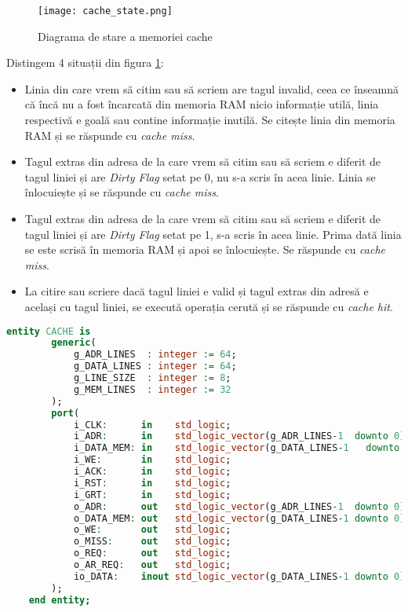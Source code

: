 \documentclass[../main.tex]{subfiles}
\begin{document}
\begin{figure}[h]
    \centering
    \texttt{[image: cache\_state.png]}
    \caption{Diagrama de stare a memoriei cache}
    \label{fig:cache_state}
\end{figure}

Distingem 4 situații din figura \ref{fig:cache_state}:
\begin{itemize}
    \item Linia din care vrem să citim sau să scriem are tagul invalid, ceea ce înseamnă că încă nu a fost încarcată din memoria RAM
    nicio informație utilă, linia respectivă e goală sau contine informație inutilă. Se citește linia din memoria RAM și
    se răspunde cu \emph{cache miss}.
    \item Tagul extras din adresa de la care vrem să citim sau să scriem e diferit de tagul liniei și are \emph{Dirty Flag} setat pe 0,
    nu s-a scris în acea linie. Linia se înlocuiește și se răspunde cu \emph{cache miss}.
    \item Tagul extras din adresa de la care vrem să citim sau să scriem e diferit de tagul liniei și are \emph{Dirty Flag} setat pe 1,
    s-a scris în acea linie. Prima dată linia se este scrisă în memoria RAM și apoi se înlocuiește. Se răspunde cu \emph{cache miss}.
    \item La citire sau scriere dacă tagul liniei e valid și tagul extras din adresă e același cu tagul liniei, se execută
    operația cerută și se răspunde cu \emph{cache hit}. 
\end{itemize}

\begin{lstlisting}[language=VHDL, caption={Entitatea memoriei cache}, label={lst:cache}]
    entity CACHE is
        generic(
            g_ADR_LINES  : integer := 64;
            g_DATA_LINES : integer := 64;
            g_LINE_SIZE  : integer := 8;
            g_MEM_LINES  : integer := 32
        );
        port(
            i_CLK:      in    std_logic;
            i_ADR:      in    std_logic_vector(g_ADR_LINES-1  downto 0);
            i_DATA_MEM: in    std_logic_vector(g_DATA_LINES-1	downto 0);
            i_WE:       in    std_logic;
            i_ACK:      in    std_logic;
            i_RST:      in    std_logic;
            i_GRT:      in    std_logic;
            o_ADR:      out   std_logic_vector(g_ADR_LINES-1  downto 0); 
            o_DATA_MEM: out   std_logic_vector(g_DATA_LINES-1 downto 0);
            o_WE:       out   std_logic;
            o_MISS:     out   std_logic;
            o_REQ:      out	  std_logic;
            o_AR_REQ:   out   std_logic;
            io_DATA:    inout std_logic_vector(g_DATA_LINES-1 downto 0)
        );
    end entity;
    \end{lstlisting}
\end{document}
